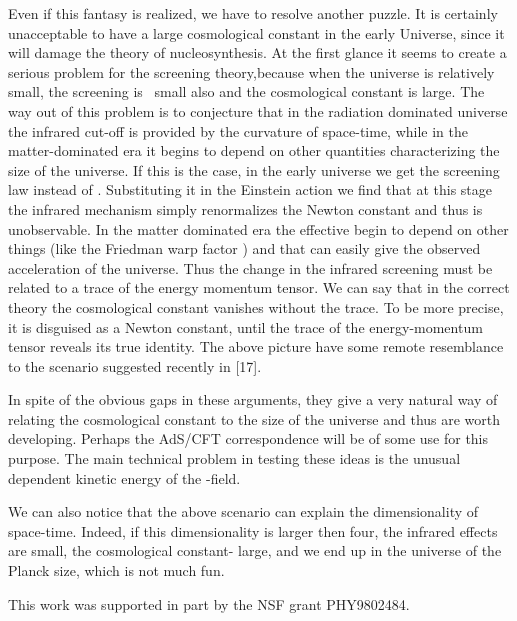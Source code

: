 \documentclass[a4paper,12pt]{article}
\begin{document}
Even if this fantasy is realized, we have to resolve another puzzle. It is
certainly unacceptable to have a large cosmological constant in the early
Universe, since it will damage the theory of nucleosynthesis. At the first
glance it seems to create a serious problem for the screening theory,because
when the universe is relatively small, the screening is \ small also and the
cosmological constant is large. The way out of this problem is to conjecture
that in the radiation dominated universe the infrared cut-off is provided by
the curvature of space-time, while in the matter-dominated era it begins to
depend on other quantities characterizing the size of the universe. If this
is the case, in the early universe we get the screening law \coordHE{}
instead of \coordHE{} . Substituting it in the Einstein action we
find that at this stage the infrared mechanism simply renormalizes the
Newton constant and thus is unobservable. In the matter dominated era the
effective \myHighlight{$\Lambda $}\coordHE{} begin to depend on other things (like the Friedman warp
factor \coordHE{} ) and that can easily give the observed acceleration of the
universe. Thus the change in the infrared screening must be related to a
trace of the energy momentum tensor. We can say that in the correct theory
the cosmological constant vanishes without the trace. To be more precise, it
is disguised as a Newton constant, until the trace of the energy-momentum
tensor reveals its true identity. The above picture have some remote
resemblance to the scenario suggested recently in [17].

In spite of the obvious gaps in these arguments, they give a very natural
way of relating the cosmological constant to the size of the universe and
thus are worth developing. Perhaps the AdS/CFT correspondence will be of
some use for this purpose. The main technical problem in testing these ideas
is the unusual \myHighlight{$\varphi -$}\coordHE{} dependent kinetic energy of the \coordHE{}-field.

We can also notice that the above scenario can explain the dimensionality of
space-time. Indeed, if this dimensionality is larger then four, the infrared
effects are small, the cosmological constant- large, and we end up in the
universe of the Planck size, which is not much fun.

This work was supported in part by the NSF grant PHY9802484.

\newpage
\end{document}
